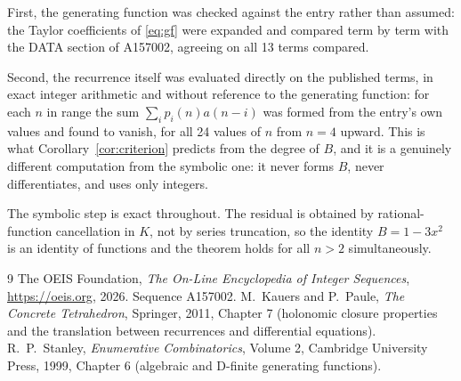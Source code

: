 \documentclass[11pt,a4paper]{article}
\theoremstyle{plain}
\theoremstyle{definition}
\begin{document}
First, the generating function was checked against the entry rather than assumed: the
Taylor coefficients of \eqref{eq:gf} were expanded and compared term by term with the DATA
section of A157002, agreeing on all 13 terms compared.

Second, the recurrence itself was evaluated directly on the published terms, in exact
integer arithmetic and without reference to the generating function: for each $n$ in range
the sum $\sum_{i}p_{i}(n)a(n-i)$ was formed from the entry's own values and found to
vanish, for all 24 values of $n$ from $n=4$ upward. This is what
Corollary~\ref{cor:criterion} predicts from the degree of $B$, and it is a genuinely
different computation from the symbolic one: it never forms $B$, never differentiates, and
uses only integers.

The symbolic step is exact throughout. The residual is obtained by rational-function
cancellation in $K$, not by series truncation, so the identity $B=1 - 3 x^{2}$ is an
identity of functions and the theorem holds for all $n>2$ simultaneously.

\begin{thebibliography}{9}
 The OEIS Foundation, \emph{The On-Line Encyclopedia of Integer Sequences},
\url{https://oeis.org}, 2026. Sequence A157002.
 M.~Kauers and P.~Paule, \emph{The Concrete Tetrahedron}, Springer, 2011,
Chapter 7 (holonomic closure properties and the translation between recurrences and
differential equations).
 R.~P.~Stanley, \emph{Enumerative Combinatorics}, Volume 2, Cambridge
University Press, 1999, Chapter 6 (algebraic and D-finite generating functions).
\end{thebibliography}
\end{document}
